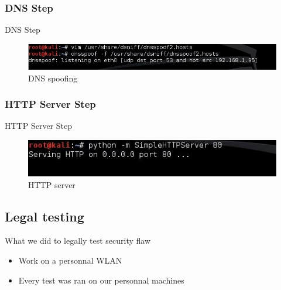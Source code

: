 \documentclass{beamer}
\begin{document}
\subsubsection{DNS Step}
\begin{frame}{DNS Step}
	\begin{figure}[!h]
		\centering
		\includegraphics[scale=0.50]{../images/dnsSpoof.jpg}
		\caption{DNS spoofing}
		\label{DNS_spoofing}
	\end{figure}
\end{frame}

\subsubsection{HTTP Server Step}
\begin{frame}{HTTP Server Step}
	\begin{figure}[!h]
		\centering
		\includegraphics[scale=0.75]{../images/serverHTTP.jpg}
		\caption{HTTP server}
		\label{serverHTTP}
	\end{figure}
\end{frame}

\subsection{Legal testing}
\begin{frame}{What we did to legally test security flaw}
	\begin{itemize}
		\pause \item Work on a personnal WLAN\\
		\pause \item Every test was ran on our personnal machines\\
	\end{itemize}
\end{frame}
\end{document}
